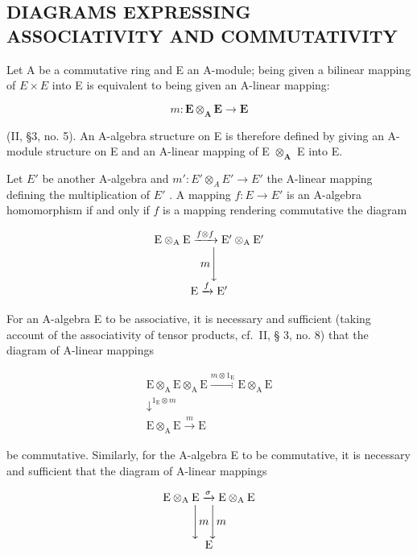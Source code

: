 \subsection{DIAGRAMS EXPRESSING ASSOCIATIVITY AND COMMUTATIVITY}

Let A be a commutative ring and E an A-module; being given a bilinear mapping of \(E \times E\) into E is equivalent to being given an A-linear mapping:

\[
m: \mathbf {E} \otimes_ {\mathbf {A}} \mathbf {E} \rightarrow \mathbf {E}
\]

(II, §3, no. 5). An A-algebra structure on E is therefore defined by giving an A-module structure on E and an A-linear mapping of E \(\otimes_{\mathbf{A}}\) E into E.

Let \(E'\) be another A-algebra and \(m': E' \otimes_{A} E' \to E'\) the A-linear mapping defining the multiplication of \(E'\) . A mapping \(f: E \to E'\) is an A-algebra homomorphism if and only if \(f\) is a mapping rendering commutative the diagram

\[
\begin{array}{c} \mathrm{E} \otimes_ {\mathrm{A}} \mathrm{E} \xrightarrow {f \otimes f} \mathrm{E} ^ {\prime} \otimes_ {\mathrm{A}} \mathrm{E} ^ {\prime} \\ m \Biggl \downarrow \\ \mathrm{E} \xrightarrow {f} \mathrm{E} ^ {\prime} \end{array}
\]

For an A-algebra E to be associative, it is necessary and sufficient (taking account of the associativity of tensor products, cf.~II, § 3, no. 8) that the diagram of A-linear mappings

\[
\begin{array}{c} \mathrm{E} \otimes_ {\mathrm{A}} \mathrm{E} \otimes_ {\mathrm{A}} \mathrm{E} \xrightarrow {m \otimes 1 _ {\mathrm{E}}} \mathrm{E} \otimes_ {\mathrm{A}} \mathrm{E} \\ \downarrow^ {1 _ {\mathrm{E}} \otimes m} \\ \mathrm{E} \otimes_ {\mathrm{A}} \mathrm{E} \xrightarrow {m} \mathrm{E} \end{array}
\]

be commutative. Similarly, for the A-algebra E to be commutative, it is necessary and sufficient that the diagram of A-linear mappings

\[
\begin{array}{c} \mathrm{E} \otimes_ {\mathrm{A}} \mathrm{E} \xrightarrow {\sigma} \mathrm{E} \otimes_ {\mathrm{A}} \mathrm{E} \\ \Biggl \downarrow m \Biggl \downarrow m \\ \mathrm{E} \end{array}
\]

